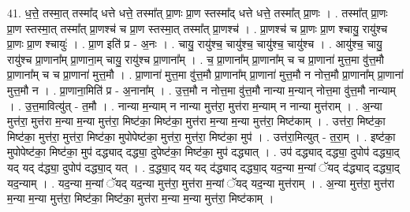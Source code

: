\documentclass[17pt]{extarticle}
\begin{document}
41. ध॒त्ते॒ तस्मा॒त् तस्मा᳚द् धत्ते धत्ते॒ तस्मा᳚त् प्रा॒णः प्रा॒ण स्तस्मा᳚द् धत्ते धत्ते॒ तस्मा᳚त् प्रा॒णः । . तस्मा᳚त् प्रा॒णः प्रा॒ण स्तस्मा॒त् तस्मा᳚त् प्रा॒णश्च॑ च प्रा॒ण स्तस्मा॒त् तस्मा᳚त् प्रा॒णश्च॑ । . प्रा॒णश्च॑ च प्रा॒णः प्रा॒ण श्चायु॒ रायु॑श्च प्रा॒णः प्रा॒ण श्चायुः॑ । . प्रा॒ण इति॑ प्र - अ॒नः । . चायु॒ रायु॑श्च॒ चायु॑श्च॒ चायु॑श्च॒ चायु॑श्च । . आयु॑श्च॒ चायु॒ रायु॑श्च प्रा॒णाना᳚म् प्रा॒णाना॒म् चायु॒ रायु॑श्च प्रा॒णाना᳚म् । . च॒ प्रा॒णाना᳚म् प्रा॒णाना᳚म् च च प्रा॒णाना॑ मुत्त॒मा वु॑त्त॒मौ प्रा॒णाना᳚म् च च प्रा॒णाना॑ मुत्त॒मौ । . प्रा॒णाना॑ मुत्त॒मा वु॑त्त॒मौ प्रा॒णाना᳚म् प्रा॒णाना॑ मुत्त॒मौ न नोत्त॒मौ प्रा॒णाना᳚म् प्रा॒णाना॑ मुत्त॒मौ न । . प्रा॒णाना॒मिति॑ प्र - अ॒नाना᳚म् । . उ॒त्त॒मौ न नोत्त॒मा वु॑त्त॒मौ नान्या म॒न्यान् नोत्त॒मा वु॑त्त॒मौ नान्याम् । . उ॒त्त॒मावित्यु॑त् - त॒मौ । . नान्या म॒न्याम् न नान्या मुत्त॑रा॒ मुत्त॑रा म॒न्याम् न नान्या मुत्त॑राम् । . अ॒न्या मुत्त॑रा॒ मुत्त॑रा म॒न्या म॒न्या मुत्त॑रा॒ मिष्ट॑का॒ मिष्ट॑का॒ मुत्त॑रा म॒न्या म॒न्या मुत्त॑रा॒ मिष्ट॑काम् । . उत्त॑रा॒ मिष्ट॑का॒ मिष्ट॑का॒ मुत्त॑रा॒ मुत्त॑रा॒ मिष्ट॑का॒ मुपोपेष्ट॑का॒ मुत्त॑रा॒ मुत्त॑रा॒ मिष्ट॑का॒ मुप॑ । . उत्त॑रा॒मित्युत् - त॒रा॒म् । . इष्ट॑का॒ मुपोपेष्ट॑का॒ मिष्ट॑का॒ मुप॑ दद्ध्याद् दद्ध्या॒ दुपेष्ट॑का॒ मिष्ट॑का॒ मुप॑ दद्ध्यात् । . उप॑ दद्ध्याद् दद्ध्या॒ दुपोप॑ दद्ध्या॒द् यद् यद् द॑द्ध्या॒ दुपोप॑ दद्ध्या॒द् यत् । . द॒द्ध्या॒द् यद् यद् द॑द्ध्याद् दद्ध्या॒द् यद॒न्या म॒न्यां ॅयद् द॑द्ध्याद् दद्ध्या॒द् यद॒न्याम् । . यद॒न्या म॒न्यां ॅयद् यद॒न्या मुत्त॑रा॒ मुत्त॑रा म॒न्यां ॅयद् यद॒न्या मुत्त॑राम् । . अ॒न्या मुत्त॑रा॒ मुत्त॑रा म॒न्या म॒न्या मुत्त॑रा॒ मिष्ट॑का॒ मिष्ट॑का॒ मुत्त॑रा म॒न्या म॒न्या मुत्त॑रा॒ मिष्ट॑काम् । \newline
\end{document}
